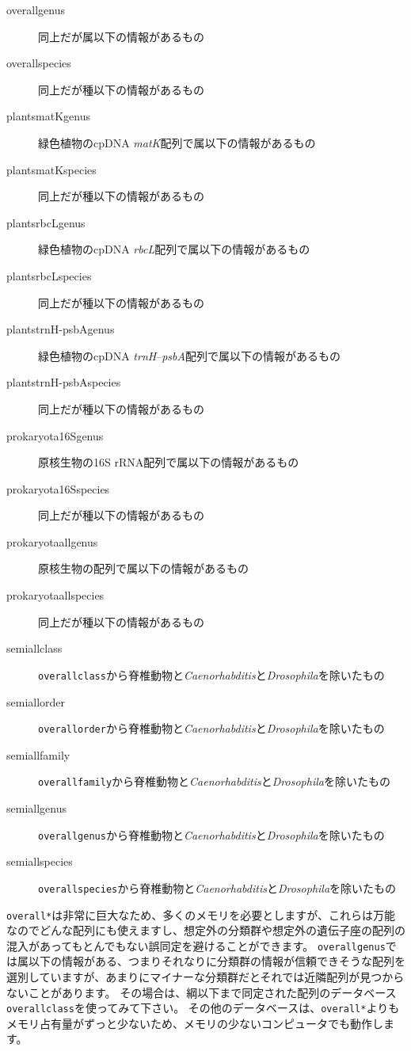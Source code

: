 \documentclass[titlepage,10pt,a4paper]{jsbook}
\begin{document}
\begin{description}
\item[overall{\textunderscore}genus] 同上だが属以下の情報があるもの
\item[overall{\textunderscore}species] 同上だが種以下の情報があるもの
\item[plants{\textunderscore}matK{\textunderscore}genus] 緑色植物のcpDNA \textit{matK}配列で属以下の情報があるもの
\item[plants{\textunderscore}matK{\textunderscore}species] 同上だが種以下の情報があるもの
\item[plants{\textunderscore}rbcL{\textunderscore}genus] 緑色植物のcpDNA \textit{rbcL}配列で属以下の情報があるもの
\item[plants{\textunderscore}rbcL{\textunderscore}species] 同上だが種以下の情報があるもの
\item[plants{\textunderscore}trnH-psbA{\textunderscore}genus] 緑色植物のcpDNA \textit{trnH}--\textit{psbA}配列で属以下の情報があるもの
\item[plants{\textunderscore}trnH-psbA{\textunderscore}species] 同上だが種以下の情報があるもの
\item[prokaryota{\textunderscore}16S{\textunderscore}genus] 原核生物の16S rRNA配列で属以下の情報があるもの
\item[prokaryota{\textunderscore}16S{\textunderscore}species] 同上だが種以下の情報があるもの
\item[prokaryota{\textunderscore}all{\textunderscore}genus] 原核生物の配列で属以下の情報があるもの
\item[prokaryota{\textunderscore}all{\textunderscore}species] 同上だが種以下の情報があるもの
\item[semiall{\textunderscore}class] \texttt{overall{\textunderscore}class}から脊椎動物と\textit{Caenorhabditis}と\textit{Drosophila}を除いたもの
\item[semiall{\textunderscore}order] \texttt{overall{\textunderscore}order}から脊椎動物と\textit{Caenorhabditis}と\textit{Drosophila}を除いたもの
\item[semiall{\textunderscore}family] \texttt{overall{\textunderscore}family}から脊椎動物と\textit{Caenorhabditis}と\textit{Drosophila}を除いたもの
\item[semiall{\textunderscore}genus] \texttt{overall{\textunderscore}genus}から脊椎動物と\textit{Caenorhabditis}と\textit{Drosophila}を除いたもの
\item[semiall{\textunderscore}species] \texttt{overall{\textunderscore}species}から脊椎動物と\textit{Caenorhabditis}と\textit{Drosophila}を除いたもの
\end{description}
\texttt{overall{\textunderscore}*}は非常に巨大なため、多くのメモリを必要としますが、これらは万能なのでどんな配列にも使えますし、想定外の分類群や想定外の遺伝子座の配列の混入があってもとんでもない誤同定を避けることができます。
\texttt{overall{\textunderscore}genus}では属以下の情報がある、つまりそれなりに分類群の情報が信頼できそうな配列を選別していますが、あまりにマイナーな分類群だとそれでは近隣配列が見つからないことがあります。
その場合は、綱以下まで同定された配列のデータベース\texttt{overall{\textunderscore}class}を使ってみて下さい。
その他のデータベースは、\texttt{overall{\textunderscore}*}よりもメモリ占有量がずっと少ないため、メモリの少ないコンピュータでも動作します。
\end{document}
